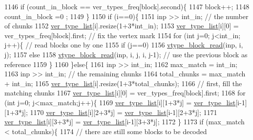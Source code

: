 \begin{DoxyCode}
1146     \textcolor{keywordflow}{if} (count\_in\_block == ver\_types\_freq[block].second)\{
1147       block++;
1148       count\_in\_block =0 ;
1149     \}
1150     \textcolor{keywordflow}{if} (i==0)\{
1151       inp >> int\_in; \textcolor{comment}{// the number of chunks}
1152       \hyperlink{classmarked__graph__compressed_af2e3e55223d436628a02758dfae88493}{ver\_type\_list}[i].resize(1+3*int\_in);
1153       \hyperlink{classmarked__graph__compressed_af2e3e55223d436628a02758dfae88493}{ver\_type\_list}[i][0] = ver\_types\_freq[block].first; \textcolor{comment}{// fix the vertex mark}
1154       \textcolor{keywordflow}{for} (\textcolor{keywordtype}{int} j=0; j<int\_in; j++)\{ \textcolor{comment}{// read blocks one by one}
1155         \textcolor{keywordflow}{if} (j==0)
1156           \hyperlink{classmarked__graph__compressed_a4bf8563a2dfd3038dc5833c014320487}{vtype\_block\_read}(inp, i, j);
1157         \textcolor{keywordflow}{else}
1158           \hyperlink{classmarked__graph__compressed_a4bf8563a2dfd3038dc5833c014320487}{vtype\_block\_read}(inp, i, j, i, j-1); \textcolor{comment}{// use the previous block as reference}
1159       \}
1160     \}\textcolor{keywordflow}{else}\{
1161       inp >> int\_in;
1162       max\_match = int\_in;
1163       inp >> int\_in; \textcolor{comment}{// the remaining chunks}
1164       total\_chunks = max\_match + int\_in; 
1165       \hyperlink{classmarked__graph__compressed_af2e3e55223d436628a02758dfae88493}{ver\_type\_list}[i].resize(1+3*total\_chunks);
1166       \textcolor{comment}{// first, fill the matching chunks}
1167       \hyperlink{classmarked__graph__compressed_af2e3e55223d436628a02758dfae88493}{ver\_type\_list}[i][0] = ver\_types\_freq[block].first;
1168       \textcolor{keywordflow}{for} (\textcolor{keywordtype}{int} j=0; j<max\_match;j++)\{
1169         \hyperlink{classmarked__graph__compressed_af2e3e55223d436628a02758dfae88493}{ver\_type\_list}[i][1+3*j] = \hyperlink{classmarked__graph__compressed_af2e3e55223d436628a02758dfae88493}{ver\_type\_list}[i-1][1+3*j];
1170         \hyperlink{classmarked__graph__compressed_af2e3e55223d436628a02758dfae88493}{ver\_type\_list}[i][2+3*j] = \hyperlink{classmarked__graph__compressed_af2e3e55223d436628a02758dfae88493}{ver\_type\_list}[i-1][2+3*j];
1171         \hyperlink{classmarked__graph__compressed_af2e3e55223d436628a02758dfae88493}{ver\_type\_list}[i][3+3*j] = \hyperlink{classmarked__graph__compressed_af2e3e55223d436628a02758dfae88493}{ver\_type\_list}[i-1][3+3*j];
1172       \}
1173       \textcolor{keywordflow}{if} (max\_match < total\_chunks)\{
1174         \textcolor{comment}{// there are still some blocks to be decoded}

\end{DoxyCode}
